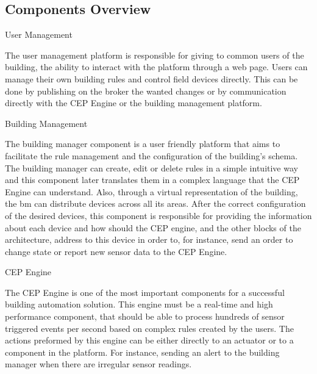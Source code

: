 \subsection{Components Overview}

\begin{Paragraph}{User Management}
	
	The user management platform is responsible for giving to common users of the building, the ability to interact with the platform through a web page. Users can manage their own building rules and control field devices directly. This can be done by publishing on the broker the wanted changes or by communication directly with the CEP Engine or the building management platform.
	
\end{Paragraph}

\begin{Paragraph}{Building Management}
	
	The building manager component is a user friendly platform that aims to facilitate the rule management and the configuration of the building's schema. The building manager can create, edit  or delete rules in a simple intuitive way and this component later translates them in a complex language that the CEP Engine can understand. Also, through a virtual representation of the building, the \ac{bm} can distribute devices across all its areas. After the correct configuration of the desired devices, this component is responsible for providing the information about each device and how should the CEP engine, and the other blocks of the architecture, address to this device in order to, for instance, send an order to change state or report new sensor data to the CEP Engine.
	
\end{Paragraph}

\begin{Paragraph}{CEP Engine}
	
	The CEP Engine is one of the most important components for a successful building automation solution. This engine must be a real-time and high performance component, that should be able to process hundreds of sensor triggered events per second based on complex rules created by the users. The actions preformed by this engine can be either directly to an actuator or to a component in the platform. For instance, sending an alert to the building manager when there are irregular sensor readings.
	
	
\end{Paragraph}

